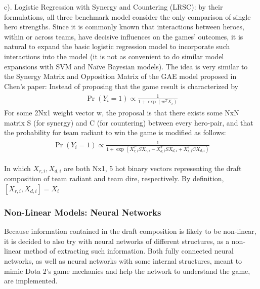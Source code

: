 \documentclass{article}
\begin{document}
c). Logistic Regression with Synergy and Countering (LRSC): by their formulations, all three benchmark model consider the only comparison of single hero strengths. Since it is commonly known that interactions between heroes, within or across teams, have decisive influences on the games’ outcomes, it is natural to expand the basic logistic regression model to incorporate such interactions into the model (it is not as convenient to do similar model expansions with SVM and Naïve Bayesian models). The idea is very similar to the Synergy Matrix and Opposition Matrix of the GAE model proposed in Chen’s paper\cite{chen2018modeling}:
    Instead of proposing that the game result is characterized by 
    \begin{align} 
    \begin{split}
      \operatorname { Pr } \left( Y _ { i } = 1 \right) \propto \frac { 1 } { 1 + \exp \left( w ^ { T } X _ { i } \right) }
    \end{split}         
    \end{align}
    For some 2Nx1 weight vector w, the proposal is that there exists some NxN matrix S (for synergy) and C (for countering) between every hero-pair, and that the probability for team radiant to win the game is modified as follows:
    \begin{align} 
    \begin{split}
      \operatorname { Pr } \left( Y _ { i } = 1 \right) \propto \frac { 1 } { 1 + \exp \left( X _ { r , i } ^ { T } S X _ { r , i } - X _ { d , i } ^ { T } S X _ { d , i } + X _ { r , i } ^ { T } C X _ { d , i } \right) }
    \end{split}         
    \end{align}

In which $X_{r,i},X_{d,i}$ are both Nx1, 5 hot binary vectors representing the draft composition of team radiant and team dire, respectively. By definition, $[X_{r,i},X_{d,i} ]= X_i$


\subsubsection{Non-Linear Models: Neural Networks}
Because information contained in the draft composition is likely to be non-linear, it is decided to also try with neural networks of different structures, as a non-linear method of extracting such information. Both fully connected neural networks, as well as neural networks with some internal structures, meant to mimic Dota 2’s game mechanics and help the network to understand the game, are implemented.
\end{document}
